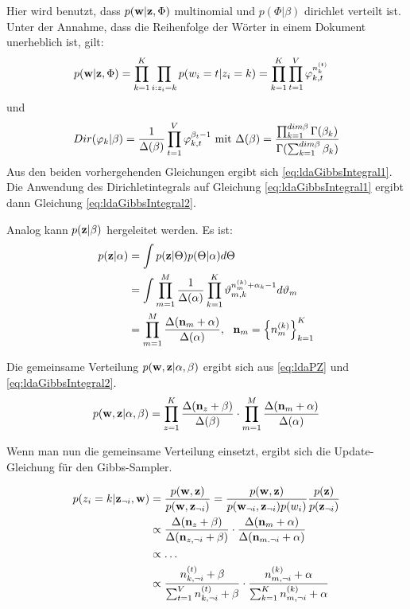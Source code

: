 Hier wird benutzt, dass $p(\mathbf{w}|\mathbf{z},\Phi)$ multinomial und $p(\Phi|\beta)$ dirichlet verteilt ist. Unter der Annahme, dass die Reihenfolge der Wörter in einem Dokument unerheblich ist, gilt:
\begin{align*}
p(\doc|\docTopic,\Phi) %
					   &= \prod^K_{k=1}\prod_{i:z_i=k}p(\word_i=t|\wordTopic_i=k) = \prod^K_{k=1}\prod^V_{t=1}\topicTermProb{k}{t}^{n^{(t)}_k}
\end{align*}
und 
\begin{align*}
Dir(\varphi_{k}|\beta) = \frac{1}{\Delta(\beta)}\prod^V_{t=1} \varphi_{k,t}^{\beta_{t}-1} \text{ mit } \Delta(\beta)=\frac{\prod^{dim \beta}_{k=1}\Gamma(\beta_k)}{\Gamma(\sum^{dim \beta}_{k=1}\beta_k)}
\end{align*}
Aus den beiden vorhergehenden Gleichungen ergibt sich \ref{eq:ldaGibbsIntegral1}. Die Anwendung des Dirichletintegrals auf Gleichung \ref{eq:ldaGibbsIntegral1} ergibt dann Gleichung \ref{eq:ldaGibbsIntegral2}.

Analog kann $p(\mathbf{z}|\beta)$ hergeleitet werden. Es ist:
\begin{align}
p(\mathbf{z}|\alpha) &= \int p(\mathbf{z}|\Theta) p(\Theta|\alpha) d\Theta \notag\\
                    &= \int \prod^M_{m=1}\frac{1}{\Delta(\alpha)}\prod^K_{k=1}\vartheta_{m,k}^{n^{(k)}_m + \alpha_k-1}  d\vartheta_{m} \\
                    &= \prod^M_{m=1} \frac{\Delta(\mathbf{n}_m+\alpha)}{\Delta(\alpha)}, \ \ \mathbf{n}_m=\left\lbrace n_m^{(k)}\right\rbrace^K_{k=1} \label{eq:ldaPZ}
\end{align}

Die gemeinsame Verteilung $p(\mathbf{w},\mathbf{z}|\alpha,\beta)$ ergibt sich aus \ref{eq:ldaPZ} und \ref{eq:ldaGibbsIntegral2}. 
\[
p(\mathbf{w},\mathbf{z}|\alpha,\beta) = \prod^K_{z=1}\frac{\Delta(\mathbf{n}_z+\beta)}{\Delta(\beta)} \cdot \prod^M_{m=1} \frac{\Delta(\mathbf{n}_m+\alpha)}{\Delta(\alpha)}
\]

Wenn man nun die gemeinsame Verteilung einsetzt, ergibt sich die Update-Gleichung für den Gibbs-Sampler. 

\begin{align}
p(z_i=k|\mathbf{z}_{\neg i},\mathbf{w}) &= \frac{p(\mathbf{w},\mathbf{z})}{p(\mathbf{w},\mathbf{z}_{\neg i})} = \frac{p(\mathbf{w},\mathbf{z})}{p(\mathbf{w}_{\neg i},\mathbf{z}_{\neg i})p(w_i)} \frac{p(\mathbf{z})}{p(\mathbf{z}_{\neg i})} \\
&\propto \frac{\Delta(\mathbf{n}_z+\beta)}{\Delta(\mathbf{n}_{z,\neg i} + \beta)} \cdot \frac{\Delta(\mathbf{n}_m+\alpha)}{\Delta(\mathbf{n}_{m.\neg i} + \alpha)} \\
&\propto \ldots \notag \\
&\propto \frac{n^{(t)}_{k,\neg i}+\beta}{\sum^{V}_{t=1}n^{(t)}_{k,\neg i} + \beta} \cdot \frac{n^{(k)}_{m,\neg i}+\alpha}{\sum^{K}_{k=1}n^{(k)}_{m,\neg i} + \alpha} \label{eq:updateEqSeen}
\end{align} 

